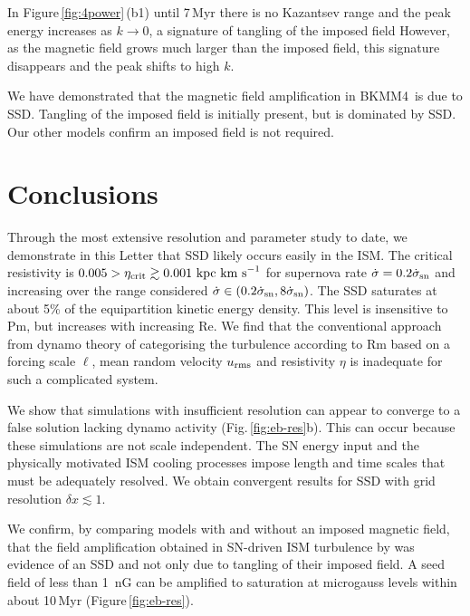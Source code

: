 \documentclass[preprint2]{aastex63}
\newcommand\SNr{\dot\sigma_{\rm sn}}
\newcommand\kpc{~ {\rm kpc}}
\newcommand\dx{ {\delta x}}
\newcommand\kms{~ {\rm km~ s}^{-1}}
\newcommand\BKM{{\sf BKMM4}}
\begin{document}
 In Figure\,\ref{fig:4power}\,(b1) {until 7\,Myr there is no Kazantsev range
 and the peak energy increases as $k\rightarrow0$, a signature of tangling of
 the imposed field
 However, as the magnetic field grows much larger than the imposed field,
 this signature disappears and the peak shifts to high $k$.}
 
 {We have demonstrated that the magnetic field amplification in \BKM\ is
 due to SSD. 
 Tangling of the imposed field is {initially} present, but is
 dominated by SSD. {O}ur other models 
 confirm an imposed field is not required.
 }

\section{Conclusions}\label{sec:conc}

 {Through the most extensive resolution and parameter study to date, we
   demonstrate in this Letter that SSD
{likely occurs easily}
 in the ISM.
 The critical resistivity is $0.005>\eta_{\rm crit}\gtrsim0.001\kpc\kms$ for 
 supernova rate $\dot \sigma=0.2\SNr$ and increasing over the 
 range considered $\dot \sigma\in(0.2\SNr,8\SNr)$.
 The SSD
 saturates at about 5\% of the equipartition kinetic energy
 density.
 This level is insensitive to Pm, but increases with increasing Re.}
 We find that the conventional approach from dynamo theory of categorising the 
 turbulence according to Rm based on a forcing scale $\ell$, mean random
 velocity $u_{\rm rms}$ and resistivity $\eta$ is inadequate for such a
 complicated system.

 We show that simulations with insufficient resolution can appear to
 converge to a false solution lacking dynamo activity
 (Fig.\,\ref{fig:eb-res}b). This can occur because these simulations are not
 scale independent. 
 The SN energy input and the physically motivated ISM cooling processes impose
 length and time scales that must be adequately resolved.
 {We obtain convergent results for SSD with grid resolution
 $\dx\lesssim1$.}

{We confirm,
  by comparing models with and without an imposed magnetic field,
 that the field amplification obtained in SN-driven ISM turbulence by
 \citet{BKMM04}
 was evidence of an SSD and not only due to tangling of their imposed field.}
 A seed field of less than 1~nG can be amplified to saturation at microgauss
 levels within about 10\,Myr (Figure\,\ref{fig:eb-res}). 
\end{document}
